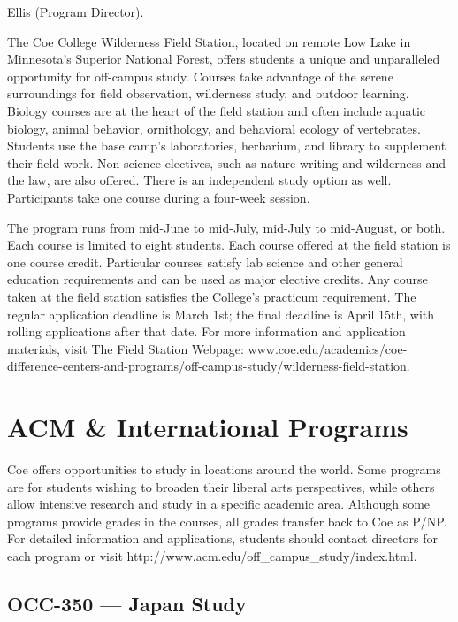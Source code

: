 \documentclass[
  letterpaper,
]{scrbook}
\begin{document}
Ellis (Program Director).

The Coe College Wilderness Field Station, located on remote Low Lake in
Minnesota's Superior National Forest, offers students a unique and
unparalleled opportunity for off-campus study. Courses take advantage of
the serene surroundings for field observation, wilderness study, and
outdoor learning. Biology courses are at the heart of the field station
and often include aquatic biology, animal behavior, ornithology, and
behavioral ecology of vertebrates. Students use the base camp's
laboratories, herbarium, and library to supplement their field work.
Non-science electives, such as nature writing and wilderness and the
law, are also offered. There is an independent study option as well.
Participants take one course during a four-week session.

The program runs from mid-June to mid-July, mid-July to mid-August, or
both. Each course is limited to eight students. Each course offered at
the field station is one course credit. Particular courses satisfy lab
science and other general education requirements and can be used as
major elective credits. Any course taken at the field station satisfies
the College's practicum requirement. The regular application deadline is
March 1st; the final deadline is April 15th, with rolling applications
after that date. For more information and application materials, visit
The Field Station Webpage:
www.coe.edu/academics/coe-difference-centers-and-programs/off-campus-study/wilderness-field-station.

\section{ACM \& International
Programs}\label{sec-ACM-and-international-programs}

Coe offers opportunities to study in locations around the world. Some
programs are for students wishing to broaden their liberal arts
perspectives, while others allow intensive research and study in a
specific academic area. Although some programs provide grades in the
courses, all grades transfer back to Coe as P/NP. For detailed
information and applications, students should contact directors for each
program or visit http://www.acm.edu/off\_campus\_study/index.html.

\subsection{OCC-350 --- Japan Study}\label{occ-350-japan-study}
\end{document}
